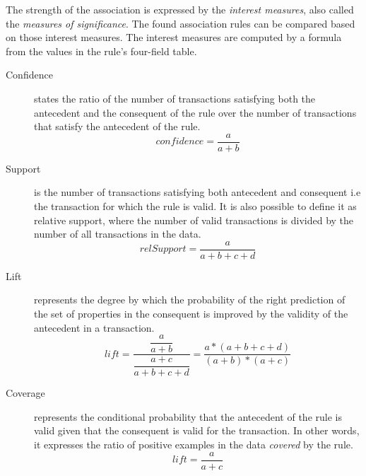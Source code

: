 The strength of the association is expressed by the \textit{interest measures}, also called the \textit{measures of significance}. The found association rules can be compared based on those interest measures. The interest measures are computed by a formula from the values in the rule's four-field table.

\begin{description}
\item [Confidence] states the ratio of the number of transactions satisfying both the antecedent and the consequent of the rule over the number of transactions that satisfy the antecedent of the rule.
$$
    confidence = \dfrac{a}{a + b}
$$
\item [Support] is the number of transactions satisfying both antecedent and consequent i.e the transaction for which the rule is valid. It is also possible to define it as relative support, where the number of valid transactions is divided by the number of all transactions in the data.
$$
    relSupport = \dfrac{a}{a + b + c + d}
$$
\item [Lift] represents the degree by which the probability of the right prediction of the set of properties in the consequent is improved by the validity of the antecedent in a transaction.
$$
    lift = \dfrac{\dfrac{a}{a + b}}{\dfrac{a + c}{a + b + c + d}} = \frac{a * (a + b + c + d)}{(a + b) * (a + c)}
$$

\item [Coverage] represents the conditional probability that the antecedent of the rule is valid given that the consequent is valid for the transaction. In other words, it expresses the ratio of positive examples in the data \textit{covered} by the rule.
$$
    lift = \dfrac{a}{a + c}
$$
\end{description}



